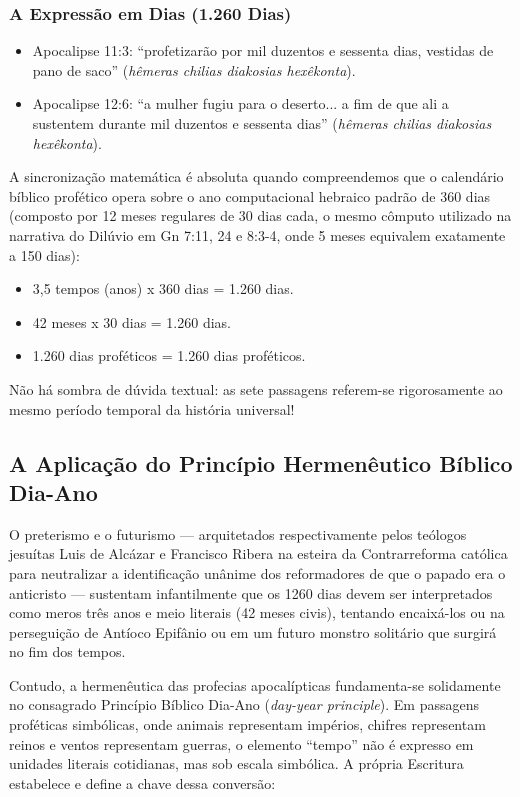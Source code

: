 \subsubsection*{A Expressão em Dias (1.260 Dias)}
\begin{itemize}
  \item Apocalipse 11:3: ``profetizarão por mil duzentos e sessenta dias, vestidas de pano de saco'' (\textit{hêmeras chilias diakosias hexêkonta}).
  \item Apocalipse 12:6: ``a mulher fugiu para o deserto... a fim de que ali a sustentem durante mil duzentos e sessenta dias'' (\textit{hêmeras chilias diakosias hexêkonta}).
\end{itemize}


A sincronização matemática é absoluta quando compreendemos que o calendário bíblico profético opera sobre o ano computacional hebraico padrão de 360 dias (composto por 12 meses regulares de 30 dias cada, o mesmo cômputo utilizado na narrativa do Dilúvio em Gn 7:11, 24 e 8:3-4, onde 5 meses equivalem exatamente a 150 dias):
\begin{itemize}
  \item 3,5 tempos (anos) x 360 dias = 1.260 dias.
  \item 42 meses x 30 dias = 1.260 dias.
  \item 1.260 dias proféticos = 1.260 dias proféticos.
\end{itemize}


Não há sombra de dúvida textual: as sete passagens referem-se rigorosamente ao mesmo período temporal da história universal!



\subsection{A Aplicação do Princípio Hermenêutico Bíblico Dia-Ano}


O preterismo e o futurismo — arquitetados respectivamente pelos teólogos jesuítas Luis de Alcázar e Francisco Ribera na esteira da Contrarreforma católica para neutralizar a identificação unânime dos reformadores de que o papado era o anticristo — sustentam infantilmente que os 1260 dias devem ser interpretados como meros três anos e meio literais (42 meses civis), tentando encaixá-los ou na perseguição de Antíoco Epifânio ou em um futuro monstro solitário que surgirá no fim dos tempos.

Contudo, a hermenêutica das profecias apocalípticas fundamenta-se solidamente no consagrado Princípio Bíblico Dia-Ano (\textit{day-year principle}). Em passagens proféticas simbólicas, onde animais representam impérios, chifres representam reinos e ventos representam guerras, o elemento ``tempo'' não é expresso em unidades literais cotidianas, mas sob escala simbólica. A própria Escritura estabelece e define a chave dessa conversão:


